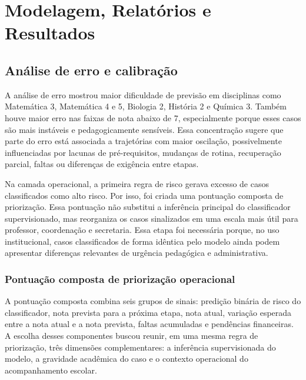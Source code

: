 \chapter{Modelagem, Relat\'orios e Resultados}
\label{cap:resultados}

\section{An\'alise de erro e calibra\c{c}\~ao}
\label{sec:erro}
\label{sec:importancia-atributos-temporais}
\label{sec:discussao-uso-pedagogico}
\label{sec:limitacoes-experimentos}
\label{sec:consideracoes-finais-resultados}

A an\'alise de erro mostrou maior dificuldade de previs\~ao em disciplinas como Matem\'atica 3, Matem\'atica 4 e 5, Biologia 2, Hist\'oria 2 e Qu\'imica 3. Tamb\'em houve maior erro nas faixas de nota abaixo de 7, especialmente porque esses casos s\~ao mais inst\'aveis e pedagogicamente sens\'iveis. Essa concentra\c{c}\~ao sugere que parte do erro est\'a associada a trajet\'orias com maior oscila\c{c}\~ao, possivelmente influenciadas por lacunas de pr\'e-requisitos, mudan\c{c}as de rotina, recupera\c{c}\~ao parcial, faltas ou diferen\c{c}as de exig\^encia entre etapas.

Na camada operacional, a primeira regra de risco gerava excesso de casos classificados como alto risco. Por isso, foi criada uma pontua\c{c}\~ao composta de prioriza\c{c}\~ao. Essa pontua\c{c}\~ao n\~ao substitui a infer\^encia principal do classificador supervisionado, mas reorganiza os casos sinalizados em uma escala mais \'util para professor, coordena\c{c}\~ao e secretaria. Essa etapa foi necess\'aria porque, no uso institucional, casos classificados de forma id\^entica pelo modelo ainda podem apresentar diferen\c{c}as relevantes de urg\^encia pedag\'ogica e administrativa.

\subsection{Pontua\c{c}\~ao composta de prioriza\c{c}\~ao operacional}
\label{subsec:pontuacao-priorizacao}

A pontua\c{c}\~ao composta combina seis grupos de sinais: predi\c{c}\~ao bin\'aria de risco do classificador, nota prevista para a pr\'oxima etapa, nota atual, varia\c{c}\~ao esperada entre a nota atual e a nota prevista, faltas acumuladas e pend\^encias financeiras. A escolha desses componentes buscou reunir, em uma mesma regra de prioriza\c{c}\~ao, tr\^es dimens\~oes complementares: a infer\^encia supervisionada do modelo, a gravidade acad\^emica do caso e o contexto operacional do acompanhamento escolar.


